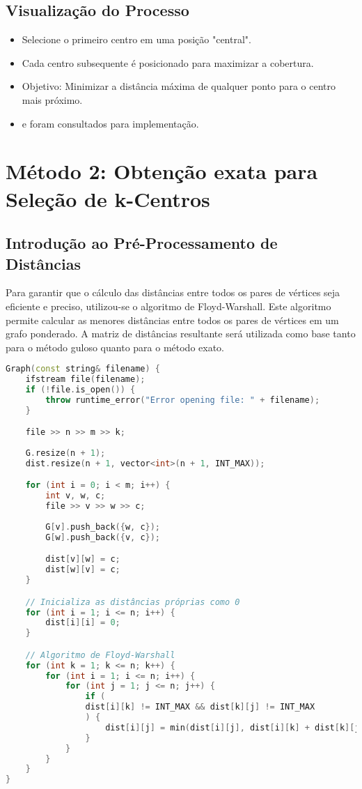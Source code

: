 \documentclass[10pt,conference]{IEEEtran}
\begin{document}
\subsection{Visualização do Processo}
\begin{itemize}
    \item Selecione o primeiro centro em uma posição "central".
    \item Cada centro subsequente é posicionado para maximizar a cobertura.
    \item Objetivo: Minimizar a distância máxima de qualquer ponto para o centro mais próximo.
    \item \cite{mount2017kcenter} e \cite{geeksforgeeks_kcenter} foram consultados para implementação.
\end{itemize}

\section{Método 2: Obtenção exata para Seleção de k-Centros}

\subsection{Introdução ao Pré-Processamento de Distâncias}
Para garantir que o cálculo das distâncias entre todos os pares de vértices seja eficiente e preciso, utilizou-se o algoritmo de Floyd-Warshall. Este algoritmo permite calcular as menores distâncias entre todos os pares de vértices em um grafo ponderado. A matriz de distâncias resultante será utilizada como base tanto para o método guloso quanto para o método exato.

\begin{lstlisting}[language=C++, caption=Pré-Processamento com Floyd-Warshall]
Graph(const string& filename) {
    ifstream file(filename);
    if (!file.is_open()) {
        throw runtime_error("Error opening file: " + filename);
    }

    file >> n >> m >> k;
    
    G.resize(n + 1);
    dist.resize(n + 1, vector<int>(n + 1, INT_MAX));

    for (int i = 0; i < m; i++) {
        int v, w, c;
        file >> v >> w >> c;
        
        G[v].push_back({w, c});
        G[w].push_back({v, c});

        dist[v][w] = c;
        dist[w][v] = c;
    }

    // Inicializa as distâncias próprias como 0
    for (int i = 1; i <= n; i++) {
        dist[i][i] = 0;
    }

    // Algoritmo de Floyd-Warshall
    for (int k = 1; k <= n; k++) {
        for (int i = 1; i <= n; i++) {
            for (int j = 1; j <= n; j++) {
                if (
                dist[i][k] != INT_MAX && dist[k][j] != INT_MAX
                ) {
                    dist[i][j] = min(dist[i][j], dist[i][k] + dist[k][j]);
                }
            }
        }
    }
}
\end{lstlisting}
\end{document}
